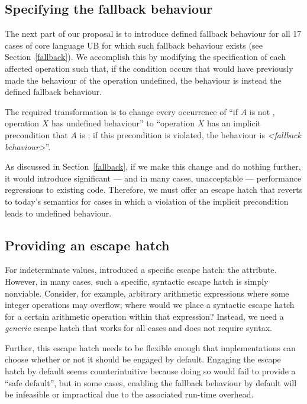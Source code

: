 \subsection{Specifying the fallback behaviour}
\label{specifyfallback}

The next part of our proposal is to introduce defined fallback behaviour for all 17 cases of core language UB for which such fallback behaviour exists (see Section~\ref{fallback}). We accomplish this by modifying the specification of each affected operation such that, if the condition occurs that would have previously made the behaviour of the operation undefined, the behaviour is instead the defined fallback behaviour.

The required transformation is to change every occurrence of “if $A$ is not , operation $X$ has undefined behaviour'' to ``operation $X$ has an implicit precondition that $A$ is ; if this precondition is violated, the behaviour is \emph{<fallback behaviour>}''.

As discussed in Section~\ref{fallback}, if we make this change and do nothing further, it would introduce significant --- and in many cases, unacceptable --- performance regressions to existing code. Therefore, we must offer an escape hatch that reverts to today's semantics for cases in which a violation of the implicit precondition leads to undefined behaviour.

\subsection{Providing an escape hatch}
\label{assume}

For indeterminate values, \cite{P2795R5} introduced a specific escape hatch: the \tcode{[[indeterminate]]} attribute. However, in many cases, such a specific, syntactic escape hatch is simply nonviable. Consider, for example, arbitrary arithmetic expressions where some integer operations may overflow; where would we place a syntactic escape hatch for a certain arithmetic operation within that expression? Instead, we need a \emph{generic} escape hatch that works for all cases and does not require syntax.

Further, this escape hatch needs to be flexible enough that implementations can choose whether or not it should be engaged by default. Engaging the escape hatch by default seems counterintuitive because doing so would fail to provide a ``safe default'', but in some cases, enabling the fallback behaviour by default will be infeasible or impractical due to the associated run-time overhead.

